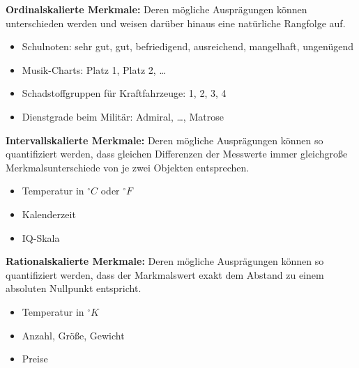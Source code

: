 \formnum \textbf{Ordinalskalierte Merkmale:} Deren mögliche Ausprägungen können
unterschieden werden und weisen darüber hinaus eine natürliche Rangfolge auf.
\begin{itemize}
  \setlength{\itemsep}{-0.5\baselineskip}
  \item Schulnoten: sehr gut, gut, befriedigend, ausreichend, mangelhaft, ungenügend
  \item Musik-Charts: Platz 1, Platz 2, \ldots
  \item Schadstoffgruppen für Kraftfahrzeuge: 1, 2, 3, 4
  \item Dienstgrade beim Militär: Admiral, \ldots, Matrose
\end{itemize}
\medskip\par

\formnum \textbf{Intervallskalierte Merkmale:} Deren mögliche Ausprägungen
können so quantifiziert werden, dass gleichen Differenzen der Messwerte immer
gleichgroße Merkmalsunterschiede von je zwei Objekten entsprechen.
\begin{itemize}
  \setlength{\itemsep}{-0.5\baselineskip}
  \item Temperatur in ${}^{\circ}C$ oder ${}^{\circ}\!F$
  \item Kalenderzeit
  \item IQ-Skala
\end{itemize}
\medskip\par

\formnum \textbf{Rationalskalierte Merkmale:} Deren mögliche Ausprägungen
können so quantifiziert werden, dass der Markmalswert exakt dem Abstand zu
einem absoluten Nullpunkt entspricht.
\begin{itemize}
  \setlength{\itemsep}{-0.5\baselineskip}
  \item Temperatur in ${}^{\circ}\!K$
  \item Anzahl, Größe, Gewicht
  \item Preise
\end{itemize}

